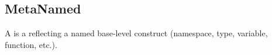 \subsection{MetaNamed}
\label{concept-MetaNamed}

A  is a  reflecting a named base-level construct
(namespace, type, variable, function, etc.).




